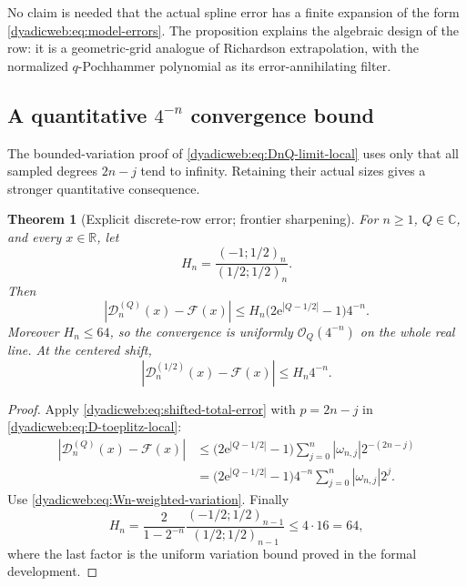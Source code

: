 \documentclass[11pt,oneside]{article}
\newtheorem{theorem}{Theorem}[section]
\theoremstyle{definition}
\theoremstyle{remark}
\newcommand{\R}{\mathbb R}
\newcommand{\C}{\mathbb C}
\newcommand{\e}{\mathrm e}
\newcommand{\bigO}{\mathcal O}
\begin{document}
No claim is needed that the actual spline error has a finite expansion of the form
\eqref{dyadicweb:eq:model-errors}.  The proposition explains the algebraic design of the row: it is a
geometric-grid analogue of Richardson extrapolation, with the normalized $q$-Pochhammer
polynomial as its error-annihilating filter.

\subsection[A quantitative four-to-the-minus-n convergence bound]{A quantitative $4^{-n}$ convergence bound}

The bounded-variation proof of \eqref{dyadicweb:eq:DnQ-limit-local} uses only that all sampled degrees
$2n-j$ tend to infinity.  Retaining their actual sizes gives a stronger quantitative
consequence.

\begin{theorem}[Explicit discrete-row error; frontier sharpening]
\label{dyadicweb:thm:D-error}
For $n\ge1$, $Q\in\C$, and every $x\in\R$, let
\begin{equation}
 H_n=\frac{(-1;1/2)_n}{(1/2;1/2)_n}.                      \label{dyadicweb:eq:Hn-def}
\end{equation}
Then
\begin{equation}
 \boxed{
 |\mathcal D_n^{(Q)}(x)-\mathcal F(x)|
 \le H_n\bigl(2\e^{|Q-1/2|}-1\bigr)4^{-n}.}              \label{dyadicweb:eq:D-error}
\end{equation}
Moreover $H_n\le64$, so the convergence is uniformly $\bigO_Q(4^{-n})$ on the whole real
line.  At the centered shift,
\begin{equation}
 |\mathcal D_n^{(1/2)}(x)-\mathcal F(x)|\le H_n4^{-n}.     \label{dyadicweb:eq:D-centered-error}
\end{equation}
\end{theorem}

\begin{proof}
Apply \eqref{dyadicweb:eq:shifted-total-error} with $p=2n-j$ in
\eqref{dyadicweb:eq:D-toeplitz-local}:
\begin{align*}
 |\mathcal D_n^{(Q)}(x)-\mathcal F(x)|
 &\le\bigl(2\e^{|Q-1/2|}-1\bigr)
 \sum_{j=0}^{n}|\omega_{n,j}|2^{-(2n-j)}\\
 &=\bigl(2\e^{|Q-1/2|}-1\bigr)4^{-n}
 \sum_{j=0}^{n}|\omega_{n,j}|2^j.
\end{align*}
Use \eqref{dyadicweb:eq:Wn-weighted-variation}.  Finally
\[
 H_n
 =\frac{2}{1-2^{-n}}
   \frac{(-1/2;1/2)_{n-1}}{(1/2;1/2)_{n-1}}
 \le4\cdot16=64,
\]
where the last factor is the uniform variation bound proved in the formal development.
\end{proof}
\end{document}
